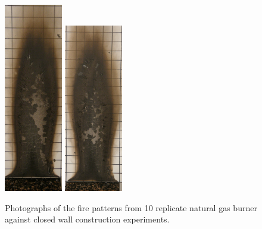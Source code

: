\documentclass[twoside]{uocthesis}
\begin{document}
{\begin{figure}[p]
	\includegraphics[width=1.0in]{../Figures/GBNG22_P5130403}
	\includegraphics[width=1.0in]{../Figures/GBNG23_P5130412} \\

	\caption[Photographs of the fire patterns from 10 replicate natural gas burner against closed wall construction experiments.]{Photographs of the fire patterns from 10 replicate natural gas burner against closed wall construction experiments.}
	\label{NG_Closed_Wall}
\end{figure}

}
\end{document}
